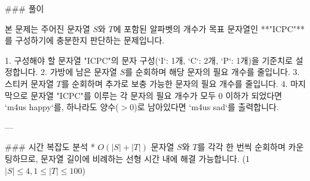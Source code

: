 ### 풀이

본 문제는 주어진 문자열 $S$와 $T$에 포함된 알파벳의 개수가 목표 문자열인 **"ICPC"**를 구성하기에 충분한지 판단하는 문제입니다.

1. 구성해야 할 문자열 "ICPC"의 문자 구성(`I`: 1개, `C`: 2개, `P`: 1개)을 기준치로 설정합니다.
2. 가방에 남은 문자열 $S$를 순회하며 해당 문자의 필요 개수를 줄입니다.
3. 스티커 문자열 $T$를 순회하며 추가로 보충 가능한 문자의 필요 개수를 줄입니다.
4. 마지막으로 문자열 "ICPC"를 이루는 각 문자의 필요 개수가 모두 $0$ 이하가 되었다면 `m4us happy`를, 하나라도 양수($>0$)로 남아있다면  `m4us sad`를 출력합니다.

---

### 시간 복잡도 분석
* $O(|S| + |T|)$  
  문자열 $S$와 $T$를 각각 한 번씩 순회하며 카운팅하므로, 문자열 길이에 비례하는 선형 시간 내에 해결 가능합니다. (1 \le $|S| \le 4, 1 \le |T| \le 100$)
